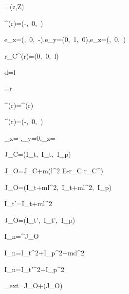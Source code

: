 %
%

\beta=\angle\left(z,Z\right)

^{(r)}=\left(-\sin\beta,\ 0,\ \cos\beta\right)

e_x=\left(\cos\beta,\ 0,\ -\sin\beta\right),\quad e_y=\left(0,\ 1,\ 0\right),\quad e_z=\left(\sin\beta,\ 0,\ \cos\beta\right)

r_C^{(r)}=\left(0,\ 0,\ l\right)

d=l\sin\beta

\theta=\omega t

\vec{\omega}^{(r)}=\omega{}^{(r)}

\vec{\omega}^{(r)}=\omega\left(-\sin\beta,\ 0,\ \cos\beta\right)

\omega_x=-\omega\sin\beta,\quad \omega_y=0,\quad \omega_z=\omega\cos\beta

J_C=\left(I_t,\ I_t,\ I_p\right)

J_O=J_C+m\left(l^2 E-r_C r_C^{}\right)

J_O=\left(I_t+ml^2,\ I_t+ml^2,\ I_p\right)

I_t'=I_t+ml^2

J_O=\left(I_t',\ I_t',\ I_p\right)

I_n=^{}J_O

I_n=I_t\sin^2\beta+I_p\cos^2\beta+md^2

I_n=I_t'\sin^2\beta+I_p\cos^2\beta

\vec{\tau}_{ext}=J_O\dot{\vec{\omega}}+\vec{\omega}\times\left(J_O\vec{\omega}\right)

